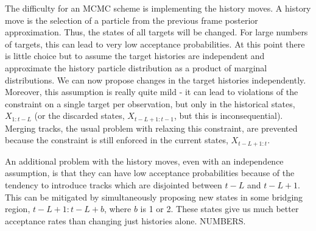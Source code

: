The difficulty for an MCMC scheme is implementing the history moves. A history move is the selection of a particle from the previous frame posterior approximation. Thus, the states of all targets will be changed. For large numbers of targets, this can lead to very low acceptance probabilities. At this point there is little choice but to assume the target histories are independent and approximate the history particle distribution as a product of marginal distributions. We can now propose changes in the target histories independently. Moreover, this assumption is really quite mild - it can lead to violations of the constraint on a single target per observation, but only in the historical states, $X_{1:t-L}$ (or the discarded states, $X_{t-L+1:t-1}$, but this is inconsequential). Merging tracks, the usual problem with relaxing this constraint, are prevented because the constraint is still enforced in the current states, $X_{t-L+1:t}$.

An additional problem with the history moves, even with an independence assumption, is that they can have low acceptance probabilities because of the tendency to introduce tracks which are disjointed between $t-L$ and $t-L+1$. This can be mitigated by simultaneously proposing new states in some bridging region, $t-L+1:t-L+b$, where $b$ is 1 or 2. These states give us much better acceptance rates than changing just histories alone. NUMBERS.
